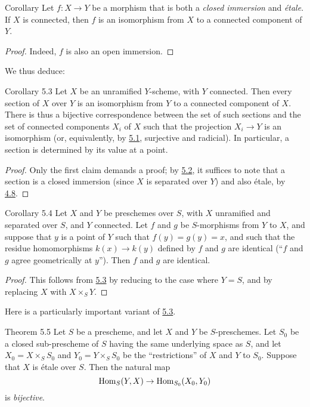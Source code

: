 \begin{itenv}{Corollary}
\label{I.5.2}
  Let $f\colon X\to Y$ be a morphism that is both a \emph{closed immersion} and \emph{étale}.
  If $X$ is connected, then $f$ is an isomorphism from $X$ to a connected component of $Y$.
\end{itenv}

\begin{proof}
  Indeed, $f$ is also an open immersion.
\end{proof}

We thus deduce:

\begin{itenv}{Corollary 5.3}
\label{I.5.3}
  Let $X$ be an unramified $Y$-scheme, with $Y$ connected.
  Then every section of $X$ over $Y$ is an isomorphism from $Y$ to a connected component of $X$.
  There is thus a bijective correspondence between the set of such sections and the set of connected components $X_i$ of $X$ such that the projection $X_i\to Y$ is an isomorphism (or, equivalently, by \hyperref[I.5.1]{5.1}, surjective and radicial).
  In particular, a section is determined by its value at a point.
\end{itenv}

\begin{proof}
  Only the first claim demands a proof;
  by \hyperref[I.5.2]{5.2}, it suffices to note that a section is a closed immersion (since $X$ is separated over $Y$) and also étale, by \hyperref[I.4.8]{4.8}.
\end{proof}

\begin{itenv}{Corollary 5.4}
\label{I.5.4}
  Let $X$ and $Y$ be preschemes over $S$, with $X$ unramified and separated over $S$, and $Y$ connected.
  Let $f$ and $g$ be $S$-morphisms from $Y$ to $X$, and suppose that $y$ is a point of $Y$ such that $f(y)=g(y)=x$, and such that the residue homomorphisms $k(x)\to k(y)$ defined by $f$ and $g$ are identical (``$f$ and $g$ agree geometrically at $y$'').
  Then $f$ and $g$ are identical.
\end{itenv}

\begin{proof}
  This follows from \hyperref[I.5.3]{5.3} by reducing to the case where $Y=S$, and by replacing $X$ with $X\times_S Y$.
\end{proof}

Here is a particularly important variant of \hyperref[I.5.3]{5.3}.

\begin{itenv}{Theorem 5.5}
\label{I.5.5}
  Let $S$ be a prescheme, and let $X$ and $Y$ be $S$-preschemes.
  Let $S_0$ be a closed sub-prescheme of $S$ having the same underlying space as $S$, and let $X_0=X\times_S S_0$ and $Y_0=Y\times_S S_0$ be the ``restrictions'' of $X$ and $Y$ to $S_0$.
  Suppose that $X$ is étale over $S$.
  Then the natural map
  \[
    \operatorname{Hom}_S(Y,X) \to \operatorname{Hom}_{S_0}(X_0,Y_0)
  \]
  is \emph{bijective}.
\end{itenv}

